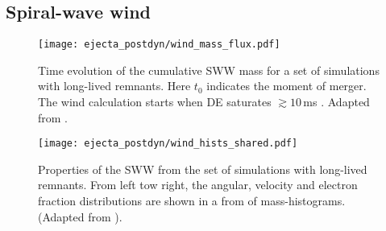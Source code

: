 \subsection{Spiral-wave wind} \label{sec:bns_sims:sww}

\begin{figure}[t]
    \centering 
    \texttt{[image: ejecta\_postdyn/wind\_mass\_flux.pdf]}
    \caption{
        Time evolution of the cumulative \ac{SWW} mass for a set of 
        simulations with long-lived remnants. 
        Here $t_0$ indicates the moment of merger. The wind 
        calculation starts when \ac{DE} saturates ${\gtrsim}10\,$ms \pmerg{}.
        Adapted from \citet{Nedora:2019jhl}.
    }
    \label{fig:mej:bern}
\end{figure}


\begin{figure*}[t]
    \centering 
    \texttt{[image: ejecta\_postdyn/wind\_hists\_shared.pdf]}
    \caption{
        Properties of the \ac{SWW} from the set of simulations with long-lived 
        remnants. From left tow right, the angular, velocity and electron fraction 
        distributions are shown in a from of mass-histograms. 
        (Adapted from \citet{Nedora:2020pak}).
    }
    \label{fig:ejecta:bern:hist}
\end{figure*}

